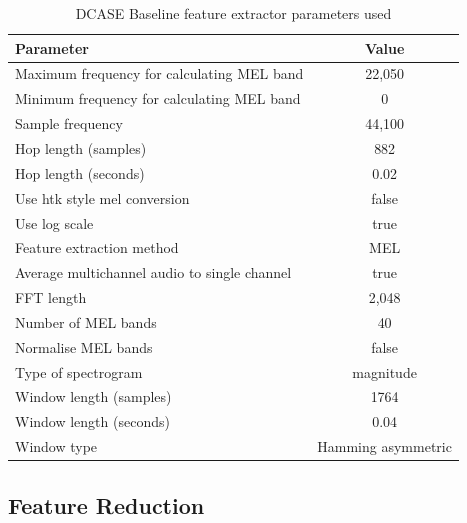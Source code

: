 \documentclass[11pt]{article}
\begin{document}
\begin{table}
	\centering
	\caption{DCASE Baseline feature extractor parameters used}
	\label{tab:featExParam}
	\begin{tabularx}{0.76\textwidth}{l c}
		\toprule
		\textbf{Parameter}                           & \textbf{Value}     \\ \midrule
		Maximum frequency for calculating MEL band   & 22,050             \\
		Minimum frequency for calculating MEL band   & 0                  \\
		Sample frequency                             & 44,100             \\
		Hop length (samples)                         & 882                \\
		Hop length (seconds)                         & 0.02               \\
		Use htk style mel conversion                 & false              \\
		Use log scale                                & true               \\
		Feature extraction method                    & MEL                \\
		Average multichannel audio to single channel & true               \\
		FFT length                                   & 2,048              \\
		Number of MEL bands                          & 40                 \\
		Normalise MEL bands                          & false              \\
		Type of spectrogram                          & magnitude          \\
		Window length (samples)                      & 1764               \\
		Window length (seconds)                      & 0.04               \\
		Window type                                  & Hamming asymmetric \\ \bottomrule
	\end{tabularx}
\end{table}




\subsection{Feature Reduction}
\label{sec:featReduce}
\end{document}
